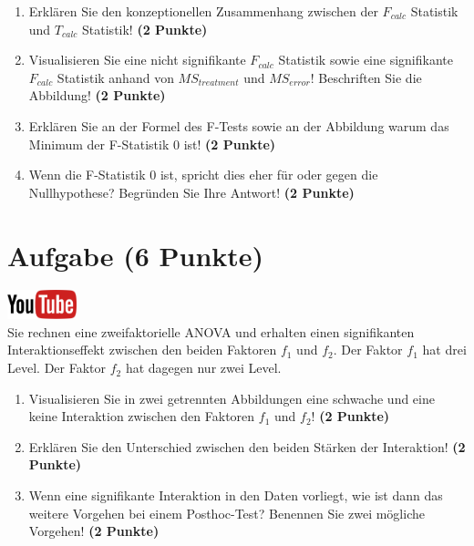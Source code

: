 \documentclass[a4paper, 10pt]{scrartcl}\usepackage[]{graphicx}\usepackage[]{xcolor}
\begin{document}
\begin{enumerate}
\item Erkl{\"a}ren Sie den konzeptionellen Zusammenhang zwischen der $F_{calc}$
  Statistik und $T_{calc}$ Statistik! \textbf{(2 Punkte)}
\item Visualisieren Sie eine nicht signifikante $F_{calc}$ Statistik sowie
  eine signifikante $F_{calc}$ Statistik anhand von $MS_{treatment}$ und
  $MS_{error}$! Beschriften Sie die Abbildung! \textbf{(2 Punkte)}
\item Erkl{\"a}ren Sie an der Formel des F-Tests sowie an der Abbildung warum
  das Minimum der F-Statistik 0 ist! \textbf{(2 Punkte)}
\item Wenn die F-Statistik 0 ist, spricht dies eher f{\"u}r oder gegen die
  Nullhypothese? Begr{\"u}nden Sie Ihre Antwort! \textbf{(2 Punkte)}
\end{enumerate}

 
\clearpage

\section{Aufgabe \hfill (6 Punkte)}

\hfill\href{https://youtu.be/2qG1Dws0MJo}{\includegraphics[width =
  2cm]{img/youtube}}\\[1Ex]


Sie rechnen eine zweifaktorielle ANOVA und erhalten einen signifikanten
Interaktionseffekt zwischen den beiden Faktoren $f_1$ und $f_2$. Der Faktor
$f_1$ hat drei Level. Der Faktor $f_2$ hat dagegen nur zwei Level.




\begin{enumerate}
\item Visualisieren Sie in zwei getrennten Abbildungen eine
  schwache und eine keine Interaktion zwischen
  den Faktoren $f_1$ und $f_2$! \textbf{(2 Punkte)}
\item Erkl{\"a}ren Sie den Unterschied zwischen den beiden St{\"a}rken der Interaktion!
  \textbf{(2 Punkte)}
\item Wenn eine signifikante Interaktion in den Daten vorliegt, wie ist
  dann das weitere Vorgehen bei einem Posthoc-Test? Benennen Sie zwei
  m{\"o}gliche Vorgehen!
  \textbf{(2 Punkte)}
\end{enumerate}
\end{document}
